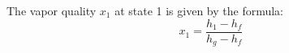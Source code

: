 The vapor quality \( x_1 \) at state 1 is given by the formula:  
\[
x_1 = \frac{h_1 - h_f}{h_g - h_f}
\]